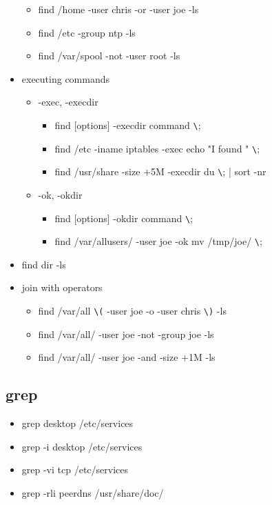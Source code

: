 \documentclass[titlepage]{article}
\begin{document}
\begin{itemize}
\begin{itemize}
              	\item find /home -user chris -or -user joe -ls
              	\item find /etc -group ntp -ls
              	\item find /var/spool -not -user root -ls
              \end{itemize}
            \item executing commands
              \begin{itemize}
              	\item -exec, -execdir
              	  \begin{itemize}
              	  	\item find [options] -execdir command {} \verb|\|;
              	  	\item find /etc -iname iptables -exec echo "I found {}" \verb|\|;
              	  	\item find /usr/share -size +5M -execdir du {} \verb|\|; | sort -nr
              	  \end{itemize}
              	\item -ok, -okdir
              	  \begin{itemize}
              	  	\item find [options] -okdir command {} \verb|\|;
              	  	\item find /var/allusers/ -user joe -ok mv {} /tmp/joe/ \verb|\|;
              	  \end{itemize}
              \end{itemize}
        	\item find dir -ls
        	\item join with operators
        	  \begin{itemize}
        	  	\item find /var/all \verb|\(| -user joe -o -user chris \verb|\)| -ls
        	  	\item find /var/all/ -user joe -not -group joe -ls
        	  	\item find /var/all/ -user joe -and -size +1M -ls
        	  \end{itemize}
        \end{itemize}
      \subsection{grep}
        \begin{itemize}
        	\item grep desktop /etc/services
        	\item grep -i desktop /etc/services
        	\item grep -vi tcp /etc/services
        	\item grep -rli peerdns /usr/share/doc/
        \end{itemize}
\end{document}
